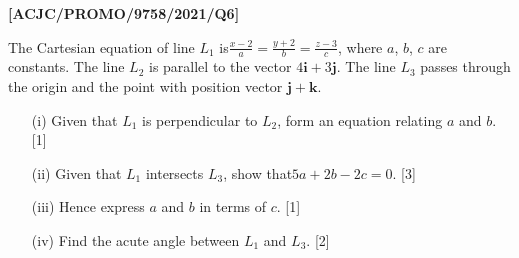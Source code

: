 \item \textbf{{[}ACJC/PROMO/9758/2021/Q6{]}}

The Cartesian equation of line $L_{1}$ is$\frac{x-2}{a}=\frac{y+2}{b}=\frac{z-3}{c}$,
where $a$, $b$, $c$ are constants. The line $L_{2}$ is parallel
to the vector $4\mathbf{i}+3\mathbf{j}$. The line $L_{3}$ passes
through the origin and the point with position vector $\mathbf{j}+\mathbf{k}$. 
\begin{enumerate}
\item[(i)]  Given that $L_{1}$ is perpendicular to $L_{2}$, form an equation
relating $a$ and $b$. \hfill{}{[}1{]}
\item[(ii)]  Given that $L_{1}$ intersects $L_{3}$, show that$5a+2b-2c=0$.
\hfill{}{[}3{]}
\item[(iii)]  Hence express $a$ and $b$ in terms of $c$. \hfill{}{[}1{]}
\item[(iv)]  Find the acute angle between $L_{1}$ and $L_{3}$. \hfill{}{[}2{]}
\end{enumerate}
